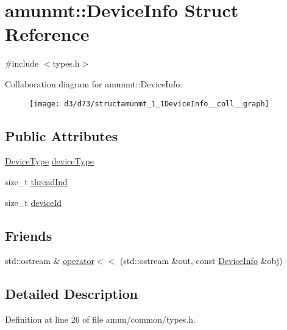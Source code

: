 \hypertarget{structamunmt_1_1DeviceInfo}{}\section{amunmt\+:\+:Device\+Info Struct Reference}
\label{structamunmt_1_1DeviceInfo}


{\ttfamily \#include $<$types.\+h$>$}



Collaboration diagram for amunmt\+:\+:Device\+Info\+:
\nopagebreak
\begin{figure}[H]
\begin{center}
\leavevmode
\texttt{[image: d3/d73/structamunmt\_1\_1DeviceInfo\_\_coll\_\_graph]}
\end{center}
\end{figure}
\subsection*{Public Attributes}
\begin{DoxyCompactItemize}
\item 
\hyperlink{namespaceamunmt_a0f0dad0deb73c5a4c574d8c63833ab17}{Device\+Type} \hyperlink{structamunmt_1_1DeviceInfo_a31a1a7886be3f6468888584ae87332d9}{device\+Type}
\item 
size\+\_\+t \hyperlink{structamunmt_1_1DeviceInfo_ab6f553877f91f2905b44af11faaf22c1}{thread\+Ind}
\item 
size\+\_\+t \hyperlink{structamunmt_1_1DeviceInfo_a20495d767d88f5eeebb3f036503034e7}{device\+Id}
\end{DoxyCompactItemize}
\subsection*{Friends}
\begin{DoxyCompactItemize}
\item 
std\+::ostream \& \hyperlink{structamunmt_1_1DeviceInfo_ab0434d0a7cd44975e6d63b8913e25766}{operator$<$$<$} (std\+::ostream \&out, const \hyperlink{structamunmt_1_1DeviceInfo}{Device\+Info} \&obj)
\end{DoxyCompactItemize}


\subsection{Detailed Description}


Definition at line 26 of file amun/common/types.\+h.



